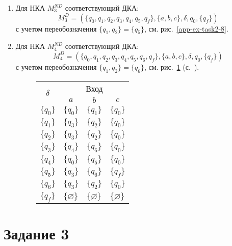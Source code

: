 \begin{enumerate}[label=(\roman{*})]
\begin{enumerate}
		\item Для НКА $M^{ND}_3$ соответствующий ДКА:
		\[M^{D}_3 = (\{q_0, q_1, q_2, q_3, q_4, q_5, q_f\}, \{a, b, c\}, \delta, q_0, \{q_f\})\]
		с учетом переобозначения $\{q_1, q_2\} = \{q_5\}$, см. рис.~\ref{app-ex-task2-8}.
		
		\item Для НКА $M^{ND}_4$ соответствующий ДКА:
		\[M^{D}_4 = (\{q_0, q_1, q_2, q_3, q_4, q_5, q_6, q_f\}, \{a, b, c\}, \delta, q_0, \{q_f\})\]
		с учетом переобозначения $\{q_1, q_2\} = \{q_6\}$, см. рис.~\ref{app-ex-task2-10} (с.~\pageref{app-ex-task2-10}).
			
\begin{figure}
\centering
			\begin{tabular}{llll}
				\toprule
				\multicolumn{1}{c}{\multirow{2}{*}{\Large $\delta$}}
				& \multicolumn{3}{c}{Вход} \\
				\cmidrule(rl){2-4}
				& \multicolumn{1}{c}{$a$}
				& \multicolumn{1}{c}{$b$} 
				& \multicolumn{1}{c}{$c$} \\
				\midrule
				$\{q_0\}$       & $\{q_0\}$      		 & $\{q_1\}$     &$\{q_0\}$  \\
				$\{q_1\}$       & $\{q_3\}$    			 & $\{q_2\}$     &$\{q_0\}$ \\
				$\{q_2\}$       & $\{q_3\}$    			 & $\{q_2\}$     &$\{q_0\}$  \\
				$\{q_3\}$       & $\{q_4\}$    			 & $\{q_6\}$     &$\{q_0\}$  \\
				$\{q_4\}$       & $\{q_0\}$    			 & $\{q_5\}$     &$\{q_0\}$  \\
				$\{q_5\}$       & $\{q_3\}$    			 & $\{q_6\}$     &$\{q_f\}$  \\
				$\{q_6\}$       & $\{q_3\}$    			 & $\{q_2\}$     &$\{q_0\}$ \\
				$\{q_f\}$       & $\{\varnothing\}$    	 & $\{\varnothing\}$     &$\{\varnothing\}$  \\
				\bottomrule
			\end{tabular}
\caption{}\label{app-ex-task2-10}
\end{figure}
		
	\end{enumerate}
\end{enumerate}

\clearpage
\section*{Задание 3}
\setcounter{section}{3}

